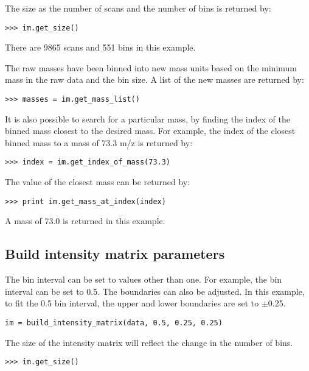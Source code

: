 The size as the number of scans and the number of bins is returned by:
\begin{verbatim}
>>> im.get_size()
\end{verbatim}

There are 9865 scans and 551 bins in this example.

The raw masses have been binned into new mass units based on the minimum mass
in the raw data and the bin size. A list of the new masses are returned by:

\begin{verbatim}
>>> masses = im.get_mass_list()
\end{verbatim}

It is also possible to search for a particular mass, by finding the index of the
binned mass closest to the desired mass. For example, the index of the closest
binned mass to a mass of 73.3 m/z is returned by:

\begin{verbatim}
>>> index = im.get_index_of_mass(73.3)
\end{verbatim}

The value of the closest mass can be returned by:

\begin{verbatim}
>>> print im.get_mass_at_index(index)
\end{verbatim}

A mass of 73.0 is returned in this example.

\subsection{Build intensity matrix parameters}


The bin interval can be set to values other than one. For example, the bin
interval can be set to 0.5. The boundaries can also be adjusted. In this
example, to fit the 0.5 bin interval, the upper and lower boundaries are set to
$\pm$0.25.

\begin{verbatim}
im = build_intensity_matrix(data, 0.5, 0.25, 0.25)
\end{verbatim}

The size of the intensity matrix will reflect the change in the number of bins.
\begin{verbatim}
>>> im.get_size()
\end{verbatim}


